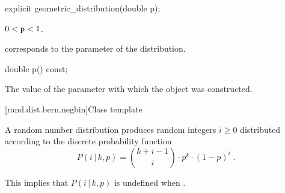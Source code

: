 %
\begin{itemdecl}
explicit geometric_distribution(double p);
\end{itemdecl}

\begin{itemdescr}
\pnum
\expects
$0 < \texttt{\protect p} < 1$.

\pnum
\remarks
 corresponds to the parameter of the distribution.
\end{itemdescr}

%
\begin{itemdecl}
double p() const;
\end{itemdecl}

\begin{itemdescr}
\pnum
\returns
The value of the  parameter
 with which the object was constructed.
\end{itemdescr}


[rand.dist.bern.negbin]{Class template }
%

\pnum
A  random number distribution
produces random integers $i \geq 0$
distributed according to
the discrete probability function
\[ P(i\,|\,k,p) = \binom{k+i-1}{i} \cdot p^k \cdot (1-p)^i \text{ .} \]
\begin{note}
This implies that $P(i\,|\,k,p)$ is undefined when .
\end{note}

